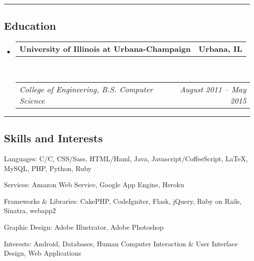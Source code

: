 \documentclass[10pt,letterpaper]{article}
\makeatletter
\newcommand{\headerrow}[2]
{\begin{tabular*}{\linewidth}{l@{\extracolsep{\fill}}r}
	#1 &
	#2 \\
\end{tabular*}}
\newcommand{\CPP}
{C\nolinebreak[4]\hspace{-.05em}\raisebox{.22ex}{\footnotesize\bf ++}}
\makeatother
\begin{document}
\hrule
\vspace{-0.4em}
\subsection*{Education}

\begin{itemize}
	\parskip=0.1em

	\item
	\headerrow
		{\textbf{University of Illinois at Urbana-Champaign}}
		{\textbf{Urbana, IL}}
	\\
	\headerrow
		{\emph{College of Engineering, B.S. Computer Science}}
		{\emph{August 2011 -- May 2015}}

\end{itemize}


\hrule
\vspace{-0.4em}
\subsection*{Skills and Interests}

\begin{description*}
	\item[Languages:]
       C/\CPP, CSS/Sass, HTML/Haml, Java, Javascript/CoffeeScript, \LaTeX, MySQL, PHP, Python, Ruby
	\item[Services:]
	Amazon Web Service, Google App Engine, Heroku
	\item[Frameworks \& Libraries:]
	CakePHP, CodeIgniter, Flask, jQuery, Ruby on Rails, Sinatra, webapp2
	\item[Graphic Design:]
	Adobe Illustrator, Adobe Photoshop
	\item[Interests:]
	Android, Databases, Human Computer Interaction \& User Interface Design, Web
	Applications
\end{description*}
\end{document}
